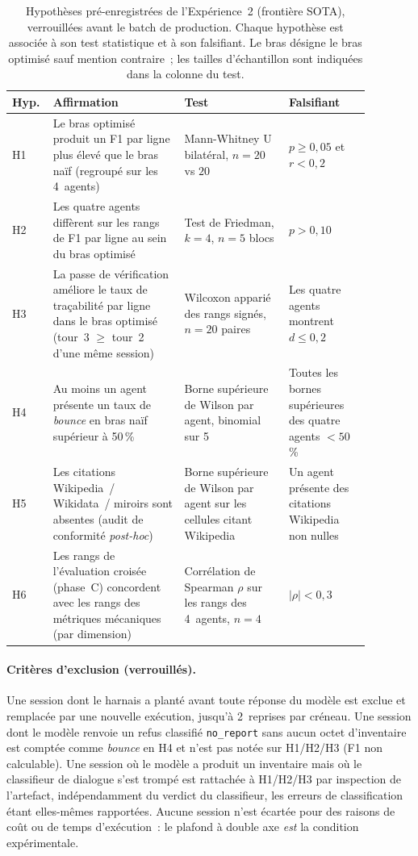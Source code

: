 \documentclass[a4paper,11pt]{report}
\begin{document}
\begin{table}[h]
\centering
\caption{Hypothèses pré-enregistrées de l'Expérience~2 (frontière SOTA), verrouillées avant le batch de production. Chaque hypothèse est associée à son test statistique et à son falsifiant. Le bras désigne le bras optimisé sauf mention contraire~; les tailles d'échantillon sont indiquées dans la colonne du test.}
\label{tab:exp2-sota:hypotheses-map}
\small
\begin{tabular}{@{}p{0.06\linewidth}p{0.34\linewidth}p{0.27\linewidth}p{0.21\linewidth}@{}}
\toprule
Hyp. & Affirmation & Test & Falsifiant \\
\midrule
H1 & Le bras optimisé produit un F1 par ligne plus élevé que le bras naïf (regroupé sur les 4~agents) & Mann-Whitney U bilatéral, $n{=}20$ vs $20$ & $p \geq 0{,}05$ et $r < 0{,}2$ \\
H2 & Les quatre agents diffèrent sur les rangs de F1 par ligne au sein du bras optimisé & Test de Friedman, $k{=}4$, $n{=}5$ blocs & $p > 0{,}10$ \\
H3 & La passe de vérification améliore le taux de traçabilité par ligne dans le bras optimisé (tour~3 $\geq$ tour~2 d'une même session) & Wilcoxon apparié des rangs signés, $n{=}20$ paires & Les quatre agents montrent $d \leq 0{,}2$ \\
H4 & Au moins un agent présente un taux de \emph{bounce} en bras naïf supérieur à 50\,\% & Borne supérieure de Wilson par agent, binomial sur 5 & Toutes les bornes supérieures des quatre agents $< 50$\,\% \\
H5 & Les citations Wikipedia~/ Wikidata~/ miroirs sont absentes (audit de conformité \emph{post-hoc}) & Borne supérieure de Wilson par agent sur les cellules citant Wikipedia & Un agent présente des citations Wikipedia non nulles \\
H6 & Les rangs de l'évaluation croisée (phase~C) concordent avec les rangs des métriques mécaniques (par dimension) & Corrélation de Spearman $\rho$ sur les rangs des 4~agents, $n{=}4$ & $|\rho| < 0{,}3$ \\
\bottomrule
\end{tabular}
\end{table}

\paragraph{Critères d'exclusion (verrouillés).} Une session dont le harnais a planté avant toute réponse du modèle est exclue et remplacée par une nouvelle exécution, jusqu'à 2~reprises par créneau. Une session dont le modèle renvoie un refus classifié \texttt{no\_report} sans aucun octet d'inventaire est comptée comme \emph{bounce} en H4 et n'est pas notée sur H1/H2/H3 (F1 non calculable). Une session où le modèle a produit un inventaire mais où le classifieur de dialogue s'est trompé est rattachée à H1/H2/H3 par inspection de l'artefact, indépendamment du verdict du classifieur, les erreurs de classification étant elles-mêmes rapportées. Aucune session n'est écartée pour des raisons de coût ou de temps d'exécution~: le plafond à double axe \emph{est} la condition expérimentale.
\end{document}
